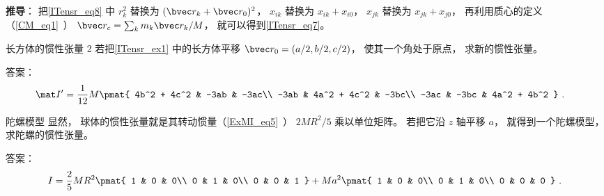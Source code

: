 \textbf{推导}： 
把\autoref{ITensr_eq8} 中 $r_k^2$ 替换为 $(\bvec r_k + \bvec r_0)^2$， $x_{ik}$ 替换为 $x_{ik} + x_{i0}$， $x_{jk}$ 替换为 $x_{jk} + x_{j0}$， 再利用质心的定义（\autoref{CM_eq1}~） $\bvec r_c = \sum_k m_k\bvec r_k/M$， 就可以得到\autoref{ITensr_eq7}。

\begin{exercise}{长方体的惯性张量 2}
若把\autoref{ITensr_ex1} 中的长方体平移 $\bvec r_0 = (a/2, b/2, c/2)$， 使其一个角处于原点， 求新的惯性张量。

答案：
\begin{equation}
\begin{aligned}
\mat I' &= \frac{1}{12} M
\pmat{
   4b^2 + 4c^2 & -3ab & -3ac\\
   -3ab & 4a^2 + 4c^2 & -3bc\\
   -3ac & -3bc & 4a^2 + 4b^2
}~.
\end{aligned}
\end{equation}
\end{exercise}
\begin{exercise}{陀螺模型}\label{ITensr_exe2}
显然， 球体的惯性张量就是其转动惯量（\autoref{ExMI_eq5}~） $2MR^2/5$ 乘以单位矩阵。 若把它沿 $z$ 轴平移 $a$， 就得到一个陀螺模型， 求陀螺的惯性张量。

答案：
\begin{equation}
I = \frac{2}{5}MR^2\pmat{
   1 & 0 & 0\\
   0 & 1 & 0\\
   0 & 0 & 1
} + Ma^2 \pmat{
   1 & 0 & 0\\
   0 & 1 & 0\\
   0 & 0 & 0
}~.\end{equation}
\end{exercise}

